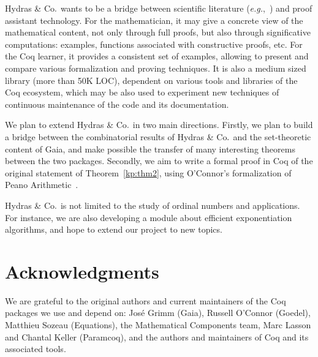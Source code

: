 \documentclass{easychair}
\newcommand{\TODO}[2][]{[\textcolor{red}{TODO (#1):} \emph{#2}]}
\newcommand{\coq}{Coq\xspace}
\newcommand{\gaia}{Gaia\xspace}
\newcommand{\Hydras}{Hydras \& Co$\text.$\xspace}
\begin{document}
\Hydras wants to be a bridge between scientific literature (\emph{e.g.},~\cite{KP82, KS81, schutte}) and proof assistant technology. For the mathematician, it may give a concrete view of the mathematical content, not only through full proofs, but also through significative computations: examples, functions associated with constructive proofs, etc. For the \coq learner, it provides a consistent set of examples,
allowing to present and compare various formalization and proving techniques. %
It is also a medium sized library (more than 50K LOC), dependent on various tools and libraries of the \coq ecosystem, which  may be also used to experiment new techniques of continuous maintenance of the code and its documentation.










We plan to extend \Hydras in two main directions. Firstly, we plan to build a bridge between the combinatorial results of \Hydras and the set-theoretic content of \gaia, and make possible the transfer of many interesting theorems between the two packages. Secondly, we aim to write a formal proof in \coq of the original statement of Theorem~\ref{kp:thm2}, using O'Connor's formalization of Peano Arithmetic~\cite{Goedel}.

\Hydras is not limited to the study of ordinal numbers and applications.
For instance, we are also developing  a module about efficient exponentiation
algorithms, and hope to extend our project to new topics.

\section{Acknowledgments}
\label{sect:acks}
We are grateful to the original authors and current maintainers of the Coq packages we use and depend on: José Grimm (Gaia), Russell O'Connor (Goedel), Matthieu Sozeau (Equations), the Mathematical Components team, Marc Lasson and Chantal Keller (Paramcoq), and the authors and maintainers of \coq and its associated tools.


\label{sect:bib}

%
%
%

\end{document}
